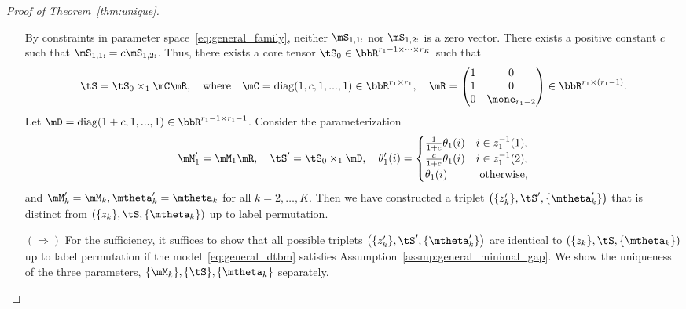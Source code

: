 \documentclass[lettersize,onecolumn,journal]{IEEEtran}
\theoremstyle{definition}
\theoremstyle{definition}
\newcommand{\of}[1]{\left(#1\right)}
\begin{document}
\begin{proof}[Proof of Theorem~\ref{thm:unique}]
\begin{enumerate}[wide]
{
\color{blue}
By constraints in parameter space~\eqref{eq:general_family}, neither $\mS_{1,1:}$ nor $\mS_{1,2:}$ is a zero vector.
}
There exists a positive constant $c$ such that $\mS_{1,1:} = c \mS_{1,2:}$. Thus, there exists a core tensor $\tS_0 \in \bbR^{r_1 -1 \times \cdots \times r_K}$ such that 
\begin{equation}
    \tS = \tS_0 \times_1 \mC \mR, \quad \text{where} \quad \mC = \text{diag}(1, c, 1,...,1) \in \bbR^{r_1 \times r_1}, \quad \mR = \begin{pmatrix}
    1& 0\\
    1&0 \\
    0 & \mone_{r_1-2}
    \end{pmatrix} \in \bbR^{r_1 \times (r_1 -1)}.
\end{equation}
Let $\mD = \text{diag}(1+c, 1,...,1) \in \bbR^{r_1 -1 \times r_1 -1}$. Consider the parameterization
\begin{equation}
    \mM'_1 = \mM_1 \mR, \quad \tS' = \tS_0 \times_1 \mD, \quad \theta'_{1}(i) = \begin{cases}
    \frac{1}{1+c} \theta_{1}(i) & i \in z_{1}^{-1}(1),\\
     \frac{c}{1+c} \theta_{1}(i) & i \in z_{1}^{-1}(2),\\
     \theta_{1}(i) & \text{ otherwise},
    \end{cases}
\end{equation}
and $\mM'_k = \mM_k, \mtheta'_k = \mtheta_k$ for all $k = 2, \ldots, K$. Then we have constructed a
triplet $\of{ \{z'_k\}, \tS', \{ \mtheta'_k \} }$ that is distinct from $\of{ \{z_k\}, \tS, \{ \mtheta_k \} }$ up to label permutation. 

\item[$(\Rightarrow)$] For the sufficiency, it suffices to show that all possible triplets $\of{ \{z'_k\}, \tS', \{ \mtheta'_k \} }$ are identical to $\of{ \{z_k\}, \tS, \{ \mtheta_k \} }$ up to label permutation if the model~\eqref{eq:general_dtbm} satisfies Assumption~\eqref{assmp:general_minimal_gap}. We show the uniqueness of the three parameters, $\{\mM_k\}, \{\tS\}, \{\mtheta_k\}$ separately.


\end{enumerate}
\end{proof}
\end{document}
